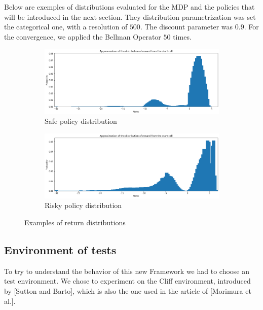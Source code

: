 Below are exemples of distributions evaluated for the MDP and the policies that will be introduced in the next section. They distribution parametrization was set the categorical one, with a resolution of $500$. The discount parameter was $0.9$. For the convergence, we applied the Bellman Operator $50$ times.

\begin{figure}[!ht]
    \centering
    \begin{subfigure}{0.95\textwidth}
        \centering
            \includegraphics[width=\textwidth]{figures/personal_work/distrib_safe_policy2.png}
        \caption{Safe policy distribution}
        \label{SafeDistrib}
    \end{subfigure}
    \hfill
    \begin{subfigure}{0.95\textwidth}
        \centering
        \includegraphics[width=\textwidth]{figures/personal_work/distrib_greedy_policy.png}
        \caption{Risky policy distribution}
        \label{GreedyDistrib}
    \end{subfigure}
        \caption{Examples of return distributions}
\end{figure}

\subsection{Environment of tests}

To try to understand the behavior of this new Framework we had to choose an test environment. We chose to experiment on the Cliff environment, introduced by [Sutton and Barto], which is also the one used in the article of [Morimura et al.].


